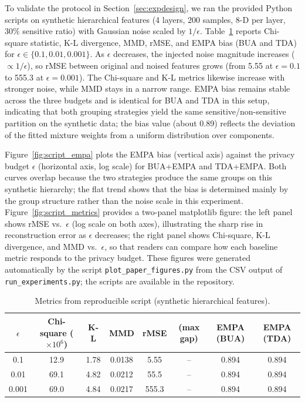 \documentclass[journal]{IEEEtran}
\begin{document}
To validate the protocol in Section~\ref{sec:expdesign}, we ran the provided Python scripts on synthetic hierarchical features (4 layers, 200 samples, 8-D per layer, 30\% sensitive ratio) with Gaussian noise scaled by $1/\epsilon$. Table~\ref{tab:script} reports Chi-square statistic, K-L divergence, MMD, rMSE, and EMPA bias (BUA and TDA) for $\epsilon \in \{0.1, 0.01, 0.001\}$. As $\epsilon$ decreases, the injected noise magnitude increases ($\propto 1/\epsilon$), so rMSE between original and noised features grows (from 5.55 at $\epsilon=0.1$ to 555.3 at $\epsilon=0.001$). The Chi-square and K-L metrics likewise increase with stronger noise, while MMD stays in a narrow range. EMPA bias remains stable across the three budgets and is identical for BUA and TDA in this setup, indicating that both grouping strategies yield the same sensitive/non-sensitive partition on the synthetic data; the bias value (about 0.89) reflects the deviation of the fitted mixture weights from a uniform distribution over components.

Figure~\ref{fig:script_empa} plots the EMPA bias (vertical axis) against the privacy budget $\epsilon$ (horizontal axis, log scale) for BUA+EMPA and TDA+EMPA. Both curves overlap because the two strategies produce the same groups on this synthetic hierarchy; the flat trend shows that the bias is determined mainly by the group structure rather than the noise scale in this experiment. Figure~\ref{fig:script_metrics} provides a two-panel matplotlib figure: the left panel shows rMSE vs.\ $\epsilon$ (log scale on both axes), illustrating the sharp rise in reconstruction error as $\epsilon$ decreases; the right panel shows Chi-square, K-L divergence, and MMD vs.\ $\epsilon$, so that readers can compare how each baseline metric responds to the privacy budget. These figures were generated automatically by the script \texttt{plot\_paper\_figures.py} from the CSV output of \texttt{run\_experiments.py}; the scripts are available in the repository.

\begin{table}[t]
\centering
\caption{Metrics from reproducible script (synthetic hierarchical features).}
\label{tab:script}
\begin{tabular}{c|ccccc|cc}
\hline
$\epsilon$ & Chi-square ($\times 10^6$) & K-L & MMD & rMSE & (max gap) & EMPA (BUA) & EMPA (TDA) \\
\hline
0.1  & 12.9 & 1.78 & 0.0138 & 5.55 & -- & 0.894 & 0.894 \\
0.01 & 69.1 & 4.82 & 0.0212 & 55.5 & -- & 0.894 & 0.894 \\
0.001& 69.0 & 4.84 & 0.0217 & 555.3 & -- & 0.894 & 0.894 \\
\hline
\end{tabular}
\end{table}
\end{document}

